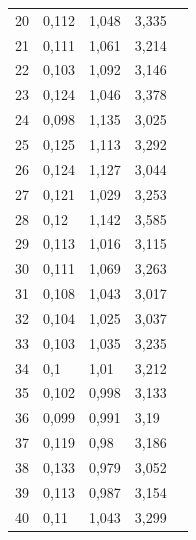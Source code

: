 \begin{longtable}[c]{|c|l|l|l|l}
  20                          & 0,112    & 1,048      & 3,335      & \\ \cline{1-4}
  21                          & 0,111    & 1,061      & 3,214      & \\ \cline{1-4}
  22                          & 0,103    & 1,092      & 3,146      & \\ \cline{1-4}
  23                          & 0,124    & 1,046      & 3,378      & \\ \cline{1-4}
  24                          & 0,098    & 1,135      & 3,025      & \\ \cline{1-4}
  25                          & 0,125    & 1,113      & 3,292      & \\ \cline{1-4}
  26                          & 0,124    & 1,127      & 3,044      & \\ \cline{1-4}
  27                          & 0,121    & 1,029      & 3,253      & \\ \cline{1-4}
  28                          & 0,12     & 1,142      & 3,585      & \\ \cline{1-4}
  29                          & 0,113    & 1,016      & 3,115      & \\ \cline{1-4}
  30                          & 0,111    & 1,069      & 3,263      & \\ \cline{1-4}
  31                          & 0,108    & 1,043      & 3,017      & \\ \cline{1-4}
  32                          & 0,104    & 1,025      & 3,037      & \\ \cline{1-4}
  33                          & 0,103    & 1,035      & 3,235      & \\ \cline{1-4}
  34                          & 0,1      & 1,01       & 3,212      & \\ \cline{1-4}
  35                          & 0,102    & 0,998      & 3,133      & \\ \cline{1-4}
  36                          & 0,099    & 0,991      & 3,19       & \\ \cline{1-4}
  37                          & 0,119    & 0,98       & 3,186      & \\ \cline{1-4}
  38                          & 0,133    & 0,979      & 3,052      & \\ \cline{1-4}
  39                          & 0,113    & 0,987      & 3,154      & \\ \cline{1-4}
  40                          & 0,11     & 1,043      & 3,299      & \\ \cline{1-4}

\end{longtable}
